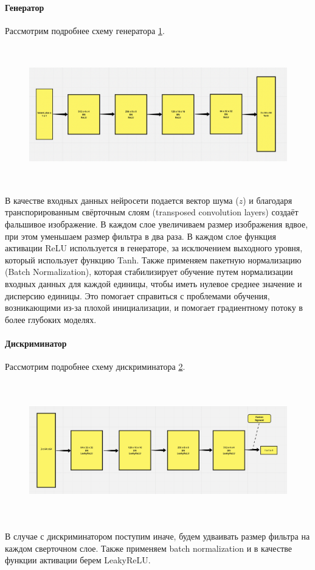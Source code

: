 \paragraph{Генератор}

Рассмотрим подробнее схему генератора {\color{blue} \ref{fig.generator_scheme_DCGAN}}.
\begin{figure}
    \centering
    \includegraphics[height=60mm]{fig/generator_scheme_DCGAN.png}
    \caption{}
    \label{fig.generator_scheme_DCGAN}
\end{figure}
В качестве входных данных нейросети подается вектор шума ($z$) и благодаря транспорированным свёрточным слоям (transposed convolution layers) создаёт фальшивое изображение. В каждом слое увеличиваем размер изображения вдвое, при этом уменьшаем размер фильтра в два раза. В каждом слое функция активации ReLU используется в генераторе, за исключением выходного уровня, который использует функцию Tanh.
Также применяем пакетную нормализацию (Batch Normalization), которая стабилизирует обучение путем нормализации входных данных для каждой единицы, чтобы иметь нулевое среднее значение и дисперсию единицы. Это помогает справиться с проблемами обучения, возникающими из-за плохой инициализации, и помогает градиентному потоку в более глубоких моделях.

\paragraph{Дискриминатор}

Рассмотрим подробнее схему дискриминатора {\color{blue} \ref{fig.discriminator_scheme_DCGAN}}.
\begin{figure}
    \centering
    \includegraphics[height=60mm]{fig/discriminator_scheme_DCGAN.png}
    \caption{}
    \label{fig.discriminator_scheme_DCGAN}
\end{figure}
В случае с дискриминатором поступим иначе, будем удваивать размер фильтра на каждом сверточном слое. Также применяем batch normalization и в качестве функции активации берем LeakyReLU.

